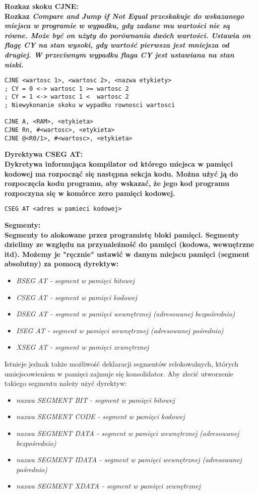 \documentclass[a4paper,12pt]{article}
\newcommand{\h}[1]{\noindent \bf #1 \rm \\ \noindent}
\newcommand{\italic}[1]{\it #1 \rm}
\begin{document}
\h{Rozkaz skoku CJNE:}
Rozkaz \it Compare and Jump if Not Equal \rm przeskakuje do wskazanego miejsca w programie w wypadku, gdy zadane mu wartości nie są równe. Może być on użyty do porównania dwóch wartości. Ustawia on flagę CY na stan wysoki, gdy wartość pierwsza jest mniejsza od drugiej. W przeciwnym wypadku flaga CY jest ustawiana na stan niski.
\begin{lstlisting}[language={[x86masm]Assembler}]
CJNE <wartosc 1>, <wartosc 2>, <nazwa etykiety>
; CY = 0 <-> wartosc 1 >= wartosc 2 
; CY = 1 <-> wartosc 1 <  wartosc 2
; Niewykonanie skoku w wypadku rownosci wartosci

CJNE A, <RAM>, <etykieta>
CJNE Rn, #<wartosc>, <etykieta>
CJNE @<R0/1>, #<wartosc>, <etykieta>
\end{lstlisting}
\vspace{5mm}

\h{Dyrektywa CSEG AT:}
Dykretywa informująca kompilator od którego miejsca w pamięci kodowej ma rozpocząć się następna sekcja kodu. Można użyć ją do rozpoczęcia kodu programu, aby wskazać, że jego kod programu rozpoczyna się w komórce zero pamięci kodowej.
\begin{lstlisting}[language={[x86masm]Assembler}]
CSEG AT <adres w pamieci kodowej>
\end{lstlisting}
\vspace{5mm}

\h{Segmenty:}
Segmenty to alokowane przez programistę bloki pamięci. Segmenty dzielimy ze względu na przynależność do pamięci (kodowa, wewnętrzne itd). Możemy je "ręcznie" ustawić w danym miejscu pamięci (segment absolutny) za pomocą dyrektyw:
\begin{itemize}
	\item \italic{BSEG AT} - segment w pamięci bitowej
	\item \italic{CSEG AT} - segment w pamięci kodowej 
	\item \italic{DSEG AT} - segment w pamięci wewnętrznej (adresowanej bezpośrednio)
	\item \italic{ISEG AT} - segment w pamięci wewnętrznej (adresowanej pośrednio)
	\item \italic{XSEG AT} - segment w pamięci zewnętrznej
\end{itemize}
\vspace{5mm}

\noindent
Istnieje jednak także możliwość deklaracji segmentów relokowalnych, których umiejscowieniem w pamięci zajmuje się konsolidator. Aby zlecić utworzenie takiego segmentu należy użyć dyrektyw:
\begin{itemize}
	\item \italic{nazwa SEGMENT BIT} - segment w pamięci bitowej
	\item \italic{nazwa SEGMENT CODE} - segment w pamięci kodowej 
	\item \italic{nazwa SEGMENT DATA} - segment w pamięci wewnętrznej (adresowanej bezpośrednio)
	\item \italic{nazwa SEGMENT IDATA} - segment w pamięci wewnętrznej (adresowanej pośrednio)
	\item \italic{nazwa SEGMENT XDATA} - segment w pamięci zewnętrznej
\end{itemize}
\vspace{5mm}
\end{document}

